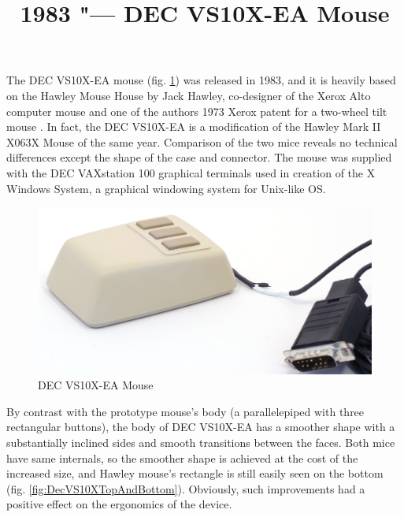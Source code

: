 \documentclass[11pt, a4paper]{article}
\begin{document}
\title{1983 "--- DEC VS10X-EA Mouse}
\date{}
\maketitle
{}
The DEC VS10X-EA mouse (fig. \ref{fig:DecVS10XPic}) was released in 1983, and it is heavily based on the Hawley Mouse House \cite{hawley,mouses} by Jack Hawley, co-designer of the Xerox Alto computer mouse and one of the authors 1973 Xerox patent for a two-wheel tilt mouse \cite{pat}. In fact, the DEC VS10X-EA is a modification of the Hawley Mark II X063X Mouse of the same year. Comparison of the two mice reveals no technical differences except the shape of the case and connector. The mouse was supplied with the DEC VAXstation 100 graphical terminals \cite{reddit} used in creation of the X Windows System, a graphical windowing system for Unix-like OS.

\begin{figure}[h]
   \centering
    \includegraphics[scale=0.6]{1983_dec_vs10x_ea_mouse/pic_30.jpg}
    \caption{DEC VS10X-EA Mouse}
    \label{fig:DecVS10XPic}
\end{figure}

By contrast with the prototype mouse’s body (a parallelepiped with three rectangular buttons), the body of DEC VS10X-EA has a smoother shape with a substantially inclined sides and smooth transitions between the faces. Both mice have same internals, so the smoother shape is achieved at the cost of the increased size, and Hawley mouse’s rectangle is still easily seen on the bottom (fig. \ref{fig:DecVS10XTopAndBottom}). Obviously, such improvements had a positive effect on the ergonomics of the device.
\end{document}
